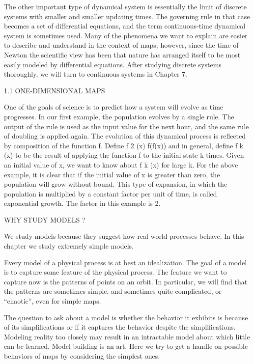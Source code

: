 \documentclass[12pt]{article}
\begin{document}
The other important type of dynamical system is essentially the limit of discrete systems with smaller and 
smaller updating times. The governing rule in that case becomes a set of differential equations, and the 
term continuous-time dynamical system is sometimes used. Many of the phenomena we want to explain are 
easier to describe and understand in the context of maps; however, since the time of Newton the scientific 
view has been that nature has arranged itself to be most easily modeled by differential equations. After 
studying discrete systems thoroughly, we will turn to continuous systems in Chapter 7.

1.1 ONE-DIMENSIONAL MAPS

One of the goals of science is to predict how a system will evolve as time progresses. In our first 
example, the population evolves by a single rule. The output of the rule is used as the input value for the 
next hour, and the same rule of doubling is applied again. The evolution of this dynamical process is 
reflected by composition of the function f. Define f 2 (x)  f(f(x)) and in general, define f k (x) to be 
the result of applying the function f to the initial state k times. Given an initial value of x, we want to 
know about f k (x) for large k. For the above example, it is clear that if the initial value of x is 
greater than zero, the population will grow without bound. This type of expansion, in which the population 
is multiplied by a constant factor per unit of time, is called exponential growth. The factor in this 
example is 2.

WHY STUDY MODELS ?

We study models because they suggest how real-world processes behave. In this chapter we study extremely 
simple models.

Every model of a physical process is at best an idealization. The goal of a model is to capture some 
feature of the physical process. The feature we want to capture now is the patterns of points on an orbit. 
In particular, we will find that the patterns are sometimes simple, and sometimes quite complicated, or 
“chaotic”, even for simple maps.

The question to ask about a model is whether the behavior it exhibits is because of its simplifications or 
if it captures the behavior despite the simplifications. Modeling reality too closely may result in an 
intractable model about which little can be learned. Model building is an art. Here we try to get a handle 
on possible behaviors of maps by considering the simplest ones.
\end{document}
